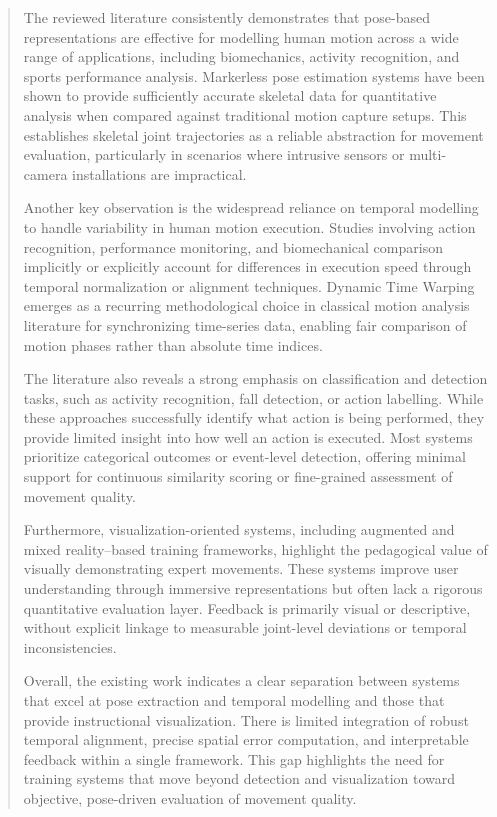\documentclass[
]{article}
\begin{document}
\begin{quote}
The reviewed literature consistently demonstrates that pose-based
representations are effective for modelling human motion across a wide
range of applications, including biomechanics, activity recognition, and
sports performance analysis. Markerless pose estimation systems have
been shown to provide sufficiently accurate skeletal data for
quantitative analysis when compared against traditional motion capture
setups. This establishes skeletal joint trajectories as a reliable
abstraction for movement evaluation, particularly in scenarios where
intrusive sensors or multi-camera installations are impractical.

Another key observation is the widespread reliance on temporal modelling
to handle variability in human motion execution. Studies involving
action recognition, performance monitoring, and biomechanical comparison
implicitly or explicitly account for differences in execution speed
through temporal normalization or alignment techniques. Dynamic Time
Warping emerges as a recurring methodological choice in classical motion
analysis literature for synchronizing time-series data, enabling fair
comparison of motion phases rather than absolute time indices.

The literature also reveals a strong emphasis on classification and
detection tasks, such as activity recognition, fall detection, or action
labelling. While these approaches successfully identify what action is
being performed, they provide limited insight into how well an action is
executed. Most systems prioritize categorical outcomes or event-level
detection, offering minimal support for continuous similarity scoring or
fine-grained assessment of movement quality.

Furthermore, visualization-oriented systems, including augmented and
mixed reality--based training frameworks, highlight the pedagogical
value of visually demonstrating expert movements. These systems improve
user understanding through immersive representations but often lack a
rigorous quantitative evaluation layer. Feedback is primarily visual or
descriptive, without explicit linkage to measurable joint-level
deviations or temporal inconsistencies.

Overall, the existing work indicates a clear separation between systems
that excel at pose extraction and temporal modelling and those that
provide instructional visualization. There is limited integration of
robust temporal alignment, precise spatial error computation, and
interpretable feedback within a single framework. This gap highlights
the need for training systems that move beyond detection and
visualization toward objective, pose-driven evaluation of movement
quality.
\end{quote}
\end{document}
